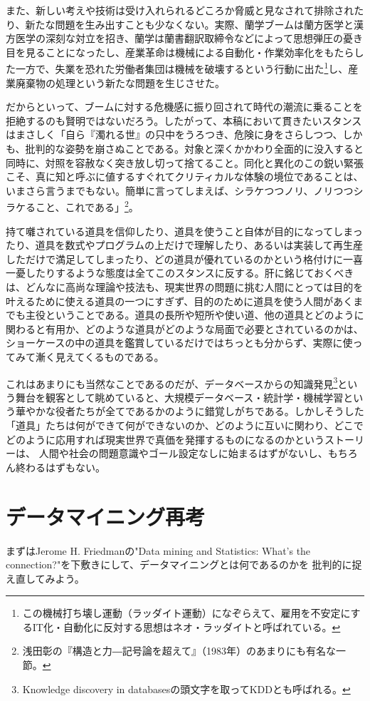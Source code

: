 また、新しい考えや技術は受け入れられるどころか脅威と見なされて排除されたり、新たな問題を生み出すことも少なくない。実際、蘭学ブームは蘭方医学と漢方医学の深刻な対立を招き、蘭学は蘭書翻訳取締令などによって思想弾圧の憂き目を見ることになったし、産業革命は機械による自動化・作業効率化をもたらした一方で、失業を恐れた労働者集団は機械を破壊するという行動に出た\footnote{この機械打ち壊し運動（ラッダイト運動）になぞらえて、雇用を不安定にするIT化・自動化に反対する思想はネオ・ラッダイトと呼ばれている。}し、産業廃棄物の処理という新たな問題を生じさせた。

だからといって、ブームに対する危機感に振り回されて時代の潮流に乗ることを拒絶するのも賢明ではないだろう。したがって、本稿において貫きたいスタンスはまさしく「自ら『濁れる世』の只中をうろつき、危険に身をさらしつつ、しかも、批判的な姿勢を崩さぬことである。対象と深くかかわり全面的に没入すると同時に、対照を容赦なく突き放し切って捨てること。同化と異化のこの鋭い緊張こそ、真に知と呼ぶに値するすぐれてクリティカルな体験の境位であることは、いまさら言うまでもない。簡単に言ってしまえば、シラケつつノリ、ノリつつシラケること、これである」\footnote{浅田彰の『構造と力―記号論を超えて』（1983年）のあまりにも有名な一節。}。

持て囃されている道具を信仰したり、道具を使うこと自体が目的になってしまったり、道具を数式やプログラムの上だけで理解したり、あるいは実装して再生産しただけで満足してしまったり、どの道具が優れているのかという格付けに一喜一憂したりするような態度は全てこのスタンスに反する。肝に銘じておくべきは、どんなに高尚な理論や技法も、現実世界の問題に挑む人間にとっては目的を叶えるために使える道具の一つにすぎず、目的のために道具を使う人間があくまでも主役ということである。道具の長所や短所や使い道、他の道具とどのように関わると有用か、どのような道具がどのような局面で必要とされているのかは、ショーケースの中の道具を鑑賞しているだけではちっとも分からず、実際に使ってみて漸く見えてくるものである。

これはあまりにも当然なことであるのだが、データベースからの知識発見\footnote{Knowledge discovery in databasesの頭文字を取ってKDDとも呼ばれる。}という舞台を観客として眺めていると、大規模データベース・統計学・機械学習という華やかな役者たちが全てであるかのように錯覚しがちである。しかしそうした「道具」たちは何ができて何ができないのか、どのように互いに関わり、どこでどのように応用すれば現実世界で真価を発揮するものになるのかというストーリーは、
人間や社会の問題意識やゴール設定なしに始まるはずがないし、もちろん終わるはずもない。

\section{データマイニング再考}
まずはJerome H. Friedmanの"Data mining and Statistics: What's the connection?"を下敷きにして、データマイニングとは何であるのかを
批判的に捉え直してみよう。

